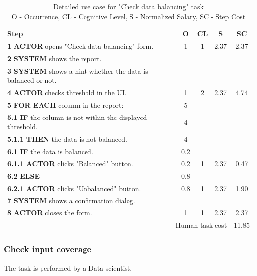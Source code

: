 \begin{table}[H]
\centering
\begin{tabularx}{\textwidth}{|X|c|c|c|c|}
\hline
\textbf{Step} & \textbf{O} & \textbf{CL} & \textbf{S} & \textbf{SC} \\
\hline
\textbf{1} \textbf{ACTOR} opens "Check data balancing" form. & 1 & 1 & 2.37 & 2.37 \\
\hline
\textbf{2} \textbf{SYSTEM} shows the report. & & & & \\
\hline
\textbf{3} \textbf{SYSTEM} shows a hint whether the data is balanced or not. & & & & \\
\hline
\textbf{4} \textbf{ACTOR} checks threshold in the UI. & 1 & 2 & 2.37 & 4.74 \\
\hline
\textbf{5} \textbf{FOR EACH} column in the report: & 5 & & & \\
\hline
\textbf{5.1} \textbf{IF} the column is not within the displayed threshold. & 4 & & & \\
\hline
\textbf{5.1.1} \textbf{THEN} the data is not balanced. & 4 & & & \\
\hline
\textbf{6.1} \textbf{IF} the data is balanced. & 0.2 & & & \\
\hline
\textbf{6.1.1} \textbf{ACTOR} clicks "Balanced" button. & 0.2 & 1 & 2.37 & 0.47 \\
\hline
\textbf{6.2} \textbf{ELSE} & 0.8 & & & \\
\hline
\textbf{6.2.1} \textbf{ACTOR} clicks "Unbalanced" button. & 0.8 & 1 & 2.37 & 1.90 \\
\hline
\textbf{7} \textbf{SYSTEM} shows a confirmation dialog. & & & & \\
\hline
\textbf{8} \textbf{ACTOR} closes the form. & 1 & 1 & 2.37 & 2.37 \\
\hline
\multicolumn{4}{|r|}{Human task cost} & 11.85 \\
\hline
\end{tabularx}
\caption{Detailed use case for "Check data balancing" task\\ 
 O - Occurrence, CL - Cognitive Level, S - Normalized Salary, SC - Step Cost}
\label{table:check_data_balancing}
\end{table}

\subsubsection{Check input coverage}

The task is performed by a Data scientist.

